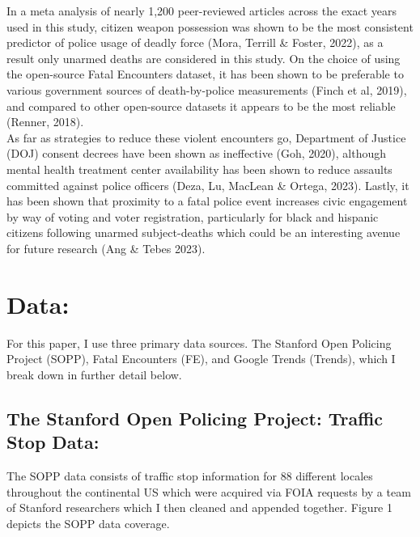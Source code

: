 \documentclass[12pt,a4paper]{article}
\begin{document}
In a meta analysis of nearly 1,200 peer-reviewed articles across the exact years used in this study, citizen weapon possession was shown to be the most consistent predictor of police usage of deadly force (Mora, Terrill \& Foster, 2022), as a result only unarmed deaths are considered in this study. On the choice of using the open-source Fatal Encounters dataset, it has been shown to be preferable to various government sources of death-by-police measurements (Finch et al, 2019), and compared to other open-source datasets it appears to be the most reliable (Renner, 2018). \\

As far as strategies to reduce these violent encounters go, Department of Justice (DOJ) consent decrees have been shown as ineffective (Goh, 2020), although mental health treatment center availability has been shown to reduce assaults committed against police officers (Deza, Lu, MacLean \& Ortega, 2023). Lastly, it has been shown that proximity to a fatal police event increases civic engagement by way of voting and voter registration, particularly for black and hispanic citizens following unarmed subject-deaths which could be an interesting avenue for future research (Ang \& Tebes 2023). \\


\section{Data:}

For this paper, I use three primary data sources. The Stanford Open Policing Project (SOPP), Fatal Encounters (FE), and Google Trends (Trends), which I break down in further detail below. \\


\subsection{The Stanford Open Policing Project: Traffic Stop Data:}

The SOPP data consists of traffic stop information for 88 different locales throughout the continental US which were acquired via FOIA requests by a team of Stanford researchers which I then cleaned and appended together. Figure 1 depicts the SOPP data coverage. \\
\end{document}
